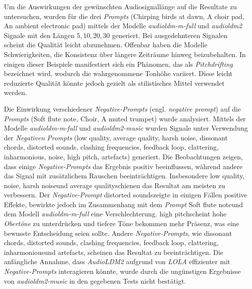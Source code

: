\documentclass[
  a4paper,  %
  twoside,  %
  bibliography=totoc,
  headsepline,
  cleardoublepage=empty,
  parskip=half,
  draft=false
]{scrbook}
\begin{document}
Um die Auswirkungen der gewünschten Audiosignallänge auf die Resultate zu untersuchen, wurden für die drei \emph{Prompts} (\glqq Chirping birds at dawn\grqq, \glqq A choir pad\grqq, \glqq An ambient electronic pad\grqq) mittels der Modelle \emph{audioldm-m-full} \cite{noauthor_cvsspaudioldm-m-full_nodate} und \emph{audioldm2} \cite{noauthor_cvsspaudioldm2_nodate} Signale mit den Längen $5,10,20,30$ generiert. Bei ausgedehnteren Signalen scheint die Qualität leicht abzunehmen. Offenbar haben die Modelle Schwierigkeiten, die Konsistenz über längere Zeiträume hinweg beizubehalten. In einigen dieser Beispiele manifestiert sich ein Phänomen, das als \emph{Pitchdrifting} bezeichnet wird, wodurch die wahrgenommene Tonhöhe variiert. Diese leicht reduzierte Qualität könnte jedoch gezielt als stilistisches Mittel verwendet werden.

Die Einwirkung verschiedener \emph{Negative-Prompts} (engl. \emph{negative prompt}) auf die \emph{Prompts} (\glqq Soft flute note\grqq, \glqq Choir\grqq, \glqq A muted trumpet\grqq) wurde analysiert. Mittels der Modelle \emph{audioldm-m-full} \cite{noauthor_cvsspaudioldm-m-full_nodate} und \emph{audioldm2-music} \cite{noauthor_cvsspaudioldm2-music_nodate} wurden Signale unter Verwendung der \emph{Negativen Prompts} (\glqq low quality\grqq, \glqq average quality\grqq, \glqq harsh noise\grqq, \glqq dissonant chords\grqq, \glqq distorted sounds\grqq, \glqq clashing frequencies\grqq, \glqq feedback loop\grqq, \glqq clattering\grqq, \glqq inharmonious\grqq, \glqq noise\grqq, \glqq high pitch\grqq, \glqq artefacts\grqq) generiert. Die Beobachtungen zeigen, dass einige \emph{Negative-Prompts} das Ergebnis positiv beeinflussen, während andere das Signal mit zusätzlichem Rauschen beeinträchtigen. Insbesondere \glqq low quality\grqq, \glqq noise\grqq, \glqq harsh noise\grqq und \glqq average quality\grqq schienen das Resultat am meisten zu verbessern. Der \emph{Negative-Prompt} \glqq distorted sounds\grqq zeigte in einigen Fällen positive Effekte, bewirkte jedoch im Zusammenhang mit dem \emph{Prompt} \glqq Soft flute note\grqq und dem Modell \emph{audioldm-m-full} eine Verschlechterung. \glqq high pitch\grqq scheint hohe \emph{Obertöne} zu unterdrücken und tiefere Töne bekommen mehr Präsenz, was eine bewusste Entscheidung seien sollte. Andere \emph{Negative-Prompts}, wie \glqq dissonant chords\grqq, \glqq distorted sounds\grqq, \glqq clashing frequencies\grqq, \glqq feedback loop\grqq, \glqq clattering\grqq, \glqq inharmonious\grqq und \glqq artefacts\grqq, scheinen das Resultat zu beeinträchtigen. Die anfängliche Annahme, dass \emph{AudioLDM2} aufgrund von \emph{LOLA} effizienter mit \emph{Negative-Prompts} interagieren könnte, wurde durch die ungünstigen Ergebnisse von \emph{audioldm2-music} in den gegebenen Tests nicht bestätigt.
\end{document}

